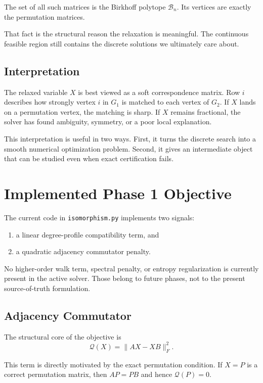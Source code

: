\documentclass[11pt]{article}
\begin{document}
The set of all such matrices is the Birkhoff polytope $\mathcal{B}_n$.
Its vertices are exactly the permutation matrices.

That fact is the structural reason the relaxation is meaningful.
The continuous feasible region still contains the discrete solutions we ultimately care about.

\subsection{Interpretation}

The relaxed variable $X$ is best viewed as a soft correspondence matrix.
Row $i$ describes how strongly vertex $i$ in $G_1$ is matched to each vertex of $G_2$.
If $X$ lands on a permutation vertex, the matching is sharp.
If $X$ remains fractional, the solver has found ambiguity, symmetry, or a poor local explanation.

This interpretation is useful in two ways.
First, it turns the discrete search into a smooth numerical optimization problem.
Second, it gives an intermediate object that can be studied even when exact certification fails.

\section{Implemented Phase 1 Objective}

The current code in \texttt{isomorphism.py} implements two signals:
\begin{enumerate}[label=\arabic*.]
    \item a linear degree-profile compatibility term, and
    \item a quadratic adjacency commutator penalty.
\end{enumerate}

No higher-order walk term, spectral penalty, or entropy regularization is currently present in the active solver.
Those belong to future phases, not to the present source-of-truth formulation.

\subsection{Adjacency Commutator}

The structural core of the objective is
\begin{equation}
\mathcal{Q}(X) = \|AX - XB\|_F^2.
\end{equation}

This term is directly motivated by the exact permutation condition.
If $X = P$ is a correct permutation matrix, then $AP = PB$ and hence $\mathcal{Q}(P) = 0$.
\end{document}
